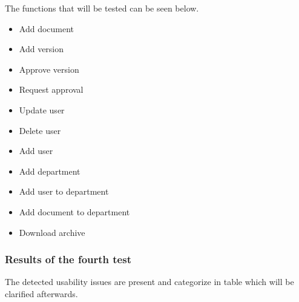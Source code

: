 \documentclass[../../master.tex]{subfiles}
\begin{document}
The functions that will be tested can be seen below.

\begin{itemize}
	\item Add document
	\item Add version
	\item Approve version
	\item Request approval
	\item Update user
	\item Delete user
	\item Add user
	\item Add department
	\item Add user to department
	\item Add document to department
	\item Download archive
\end{itemize}

\subsubsection*{Results of the fourth test}
The detected usability issues are present and categorize in table
 which will be clarified afterwards.
\end{document}
